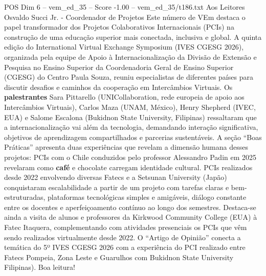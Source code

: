 \begin{textsample}{POS Dim 6 – vem\_ed\_35 – Score -1.00 – vem\_ed\_35/t186.txt}  \label{ex:f6_pos_153}
Aos Leitores Osvaldo Succi Jr. - Coordenador de Projetos Este número de VEm destaca o papel transformador dos Projetos Colaborativos Internacionais (PCIs) na construção de uma educação superior mais conectada, inclusiva e global.
A quinta edição do International Virtual Exchange Symposium (IVES CGESG 2026), organizada pela equipe de Apoio à Internacionalização da Divisão de Extensão e Pesquisa no Ensino Superior da Coordenadoria Geral de Ensino Superior (CGESG) do Centro Paula Souza, reuniu especialistas de diferentes países para discutir desafios e caminhos da cooperação em Intercâmbios Virtuais.
Os \textbf{palestrantes} Sara Pittarello (UNICollaboration, rede europeia de apoio aos Intercâmbios Virtuais), Carlos Maza (UNAM, México), Henry Shepherd (IVEC, EUA) e Salome Escalona (Bukidnon State University, Filipinas) ressaltaram que a internacionalização vai além da tecnologia, demandando interação significativa, objetivos de aprendizagem compartilhados e parcerias sustentáveis.
A seção “Boas Práticas” apresenta duas experiências que revelam a dimensão humana desses projetos: PCIs com o Chile conduzidos pelo professor Alessandro Padin em 2025 revelaram como \textbf{café} e chocolate carregam identidade cultural.
PCIs realizados desde 2022 envolvendo diversas Fatecs e a Setsunan University (Japão) conquistaram escalabilidade a partir de um projeto com tarefas claras e bem-estruturadas, plataformas tecnológicas simples e amigáveis, diálogo constante entre os docentes e aperfeiçoamento contínuo ao longo dos semestres.
Destaca-se ainda a visita de alunos e professores da Kirkwood Community College (EUA) à Fatec Itaquera, complementando com atividades presenciais os PCIs que vêm sendo realizados virtualmente desde 2022.
O “Artigo de Opinião” conecta a temática do 5º IVES CGESG 2026 com a experiência do PCI realizado entre Fatecs Pompeia, Zona Leste e Guarulhos com Bukidnon State University Filipinas).
Boa leitura!

\end{textsample}
